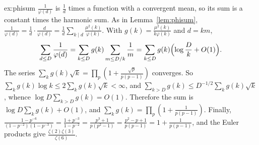 \begin{solution}{ex:phisum}
\idea $\frac1{\varphi(d)}$ is $\frac1d$ times a function with a convergent mean, so its sum is a constant times the harmonic sum.
\writeup As in Lemma~\ref{lem:phisum}, $\frac1{\varphi(d)}=\frac1d\cdot\frac d{\varphi(d)}=\frac1d\sum_{k\mid d}\frac{\mu^2(k)}{\varphi(k)}$. With $g(k)=\frac{\mu^2(k)}{k\varphi(k)}$ and $d=km$,
\[
\sum_{d\le D}\frac1{\varphi(d)}=\sum_{k\le D}g(k)\sum_{m\le D/k}\frac1m=\sum_{k\le D}g(k)\Bigl(\log\frac Dk+O(1)\Bigr).
\]
The series $\sum_kg(k)\sqrt k=\prod_p(1+\frac{\sqrt p}{p(p-1)})$ converges. So $\sum_kg(k)\log k\le2\sum_kg(k)\sqrt k<\infty$, and $\sum_{k>D}g(k)\le D^{-1/2}\sum_kg(k)\sqrt k$, whence $\log D\sum_{k>D}g(k)=O(1)$. Therefore the sum is $\log D\sum_kg(k)+O(1)$, and $\sum_kg(k)=\prod_p(1+\frac1{p(p-1)})$. Finally, $\frac{1-p^{-6}}{(1-p^{-2})(1-p^{-3})}=\frac{1+p^{-3}}{1-p^{-2}}=\frac{p^3+1}{p(p^2-1)}=\frac{p^2-p+1}{p(p-1)}=1+\frac1{p(p-1)}$, and the Euler products give $\frac{\zeta(2)\zeta(3)}{\zeta(6)}$.
\end{solution}

